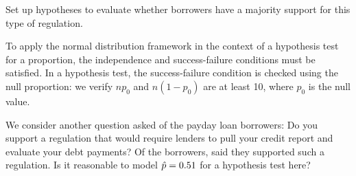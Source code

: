 \begin{exercisewrap}
\begin{nexercise}
\label{paydayCC_hypotheses_gp}%
Set up hypotheses to evaluate whether borrowers
have a majority support for this type of
regulation.\footnotemark
\end{nexercise}
\end{exercisewrap}

To apply the normal distribution framework in the context
of a hypothesis test for a proportion, the independence
and success-failure conditions must be satisfied.
In a hypothesis test, the success-failure condition is
checked using the null proportion:
we verify $np_0$ and $n(1-p_0)$ are at least 10,
where $p_0$ is the null value.

\begin{exercisewrap}
\begin{nexercise}
\label{paydayCC_conditions_gp}%
We consider another question asked
of the payday loan borrowers:
Do you support a regulation that would
require lenders to pull your credit report
and evaluate your debt payments?
Of the \paydayN{} borrowers, \paydayCCPerc{}
said they supported such a regulation.
Is it reasonable to model $\hat{p} = 0.51{}$
for a hypothesis test here?\footnotemark
\end{nexercise}
\end{exercisewrap}
    
